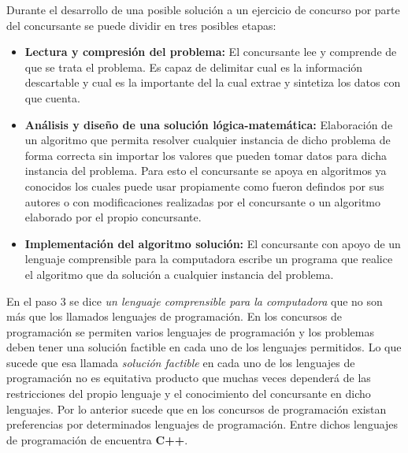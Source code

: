 Durante el desarrollo de una posible solución a un ejercicio de concurso por parte del concursante se puede dividir en tres posibles etapas:

\begin{itemize}
	\item \textbf{Lectura y compresión del problema:} El concursante lee y comprende de que se trata el problema. Es capaz de delimitar cual es la información descartable y cual es la importante del la cual extrae y sintetiza los datos con que cuenta.
	\item \textbf{Análisis y diseño de una solución lógica-matemática:} Elaboración de un algoritmo que permita resolver cualquier instancia de dicho problema de forma correcta sin importar los valores que pueden tomar datos para dicha instancia del problema. Para esto el concursante se apoya en algoritmos ya conocidos los cuales puede usar propiamente como fueron defindos por sus autores o con modificaciones realizadas por el concursante o un algoritmo elaborado por el propio concursante. 
	\item \textbf{Implementación del algoritmo solución:} El concursante con apoyo de un lenguaje comprensible para la computadora escribe un programa que realice el algoritmo que da solución a cualquier instancia del problema.
\end{itemize}

En el paso 3 se dice \emph{un lenguaje comprensible para la computadora} que no son más que los llamados lenguajes de programación. En los concursos de programación se permiten varios lenguajes de programación y los problemas deben tener una solución factible en cada uno de los lenguajes permitidos. Lo que sucede que esa llamada \emph{solución factible} en cada uno de los lenguajes de programación no es equitativa producto que muchas veces dependerá de las restricciones del propio lenguaje y el conocimiento del concursante en dicho lenguajes. Por lo anterior sucede que en los concursos de programación existan preferencias por determinados lenguajes de programación. Entre dichos lenguajes de programación de encuentra \textbf{C++}.    